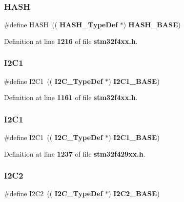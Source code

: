 \subsubsection{H\+A\+SH}
{\footnotesize\ttfamily \#define H\+A\+SH~((\textbf{ H\+A\+S\+H\+\_\+\+Type\+Def} $\ast$) \textbf{ H\+A\+S\+H\+\_\+\+B\+A\+SE})}



Definition at line \textbf{ 1216} of file \textbf{ stm32f4xx.\+h}.

\mbox{\label{group__Peripheral__declaration_gab45d257574da6fe1f091cc45b7eda6cc}} 
\subsubsection{I2\+C1\hspace{0.1cm}{\footnotesize\ttfamily [1/2]}}
{\footnotesize\ttfamily \#define I2\+C1~((\textbf{ I2\+C\+\_\+\+Type\+Def} $\ast$) \textbf{ I2\+C1\+\_\+\+B\+A\+SE})}



Definition at line \textbf{ 1161} of file \textbf{ stm32f4xx.\+h}.

\mbox{\label{group__Peripheral__declaration_gab45d257574da6fe1f091cc45b7eda6cc}} 
\subsubsection{I2\+C1\hspace{0.1cm}{\footnotesize\ttfamily [2/2]}}
{\footnotesize\ttfamily \#define I2\+C1~((\textbf{ I2\+C\+\_\+\+Type\+Def} $\ast$) \textbf{ I2\+C1\+\_\+\+B\+A\+SE})}



Definition at line \textbf{ 1237} of file \textbf{ stm32f429xx.\+h}.

\mbox{\label{group__Peripheral__declaration_gafa60ac20c1921ef1002083bb3e1f5d16}} 
\subsubsection{I2\+C2\hspace{0.1cm}{\footnotesize\ttfamily [1/2]}}
{\footnotesize\ttfamily \#define I2\+C2~((\textbf{ I2\+C\+\_\+\+Type\+Def} $\ast$) \textbf{ I2\+C2\+\_\+\+B\+A\+SE})}



